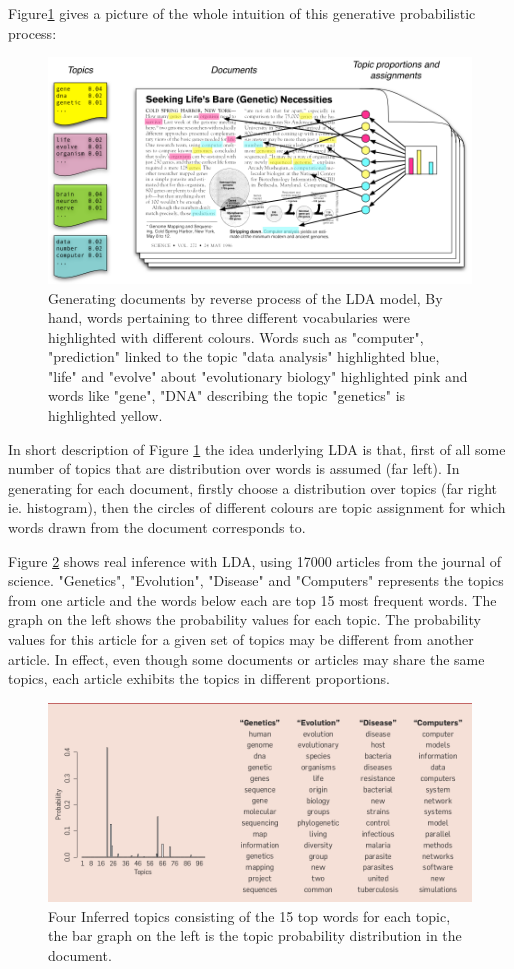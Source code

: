 Figure\ref{Figure 2.2}  gives a picture of the whole intuition of this generative probabilistic process:

\begin{figure}[hbtp]
\centering
\includegraphics[scale=0.3]{DLA_ORIG.png}
\caption{Generating documents by reverse process of the LDA model, By hand, words pertaining to three different vocabularies were highlighted with different colours. Words such as "computer", "prediction" linked to the topic "data analysis" highlighted blue, "life" and "evolve" about "evolutionary biology" highlighted pink and words like "gene", "DNA" describing the topic "genetics" is highlighted yellow.}\label{Figure 2.2}
\end{figure}
In short description of Figure \ref{Figure 2.2} the idea underlying LDA is that, first of all some number of topics that are distribution over words is assumed (far left). In generating for each document, firstly choose a distribution over topics (far right ie. histogram), then the circles of different colours are topic assignment for which words drawn from the document corresponds to.

Figure \ref{Figure 2.3} shows real inference with LDA, using 17000 articles from the journal of science. "Genetics", "Evolution", "Disease" and "Computers" represents the topics  from one article and the words below each are top 15 most frequent words. The graph on the left shows the probability values for each topic.
The probability values for this article for a given set of topics may be different from another article. In effect, even though some documents or articles may share the same topics, each article exhibits the topics in different proportions.
\begin{figure}[hbtp]
\centering
\includegraphics[scale=0.5]{infered_topics.png}
\caption{Four Inferred topics consisting of the 15 top words for each topic, the bar graph on the left is the topic probability distribution in the document.}
\label{Figure 2.3}
 \end{figure} 
